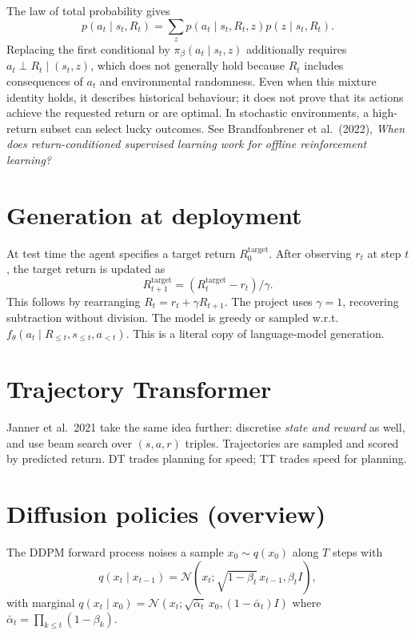 \documentclass[11pt,oneside]{scrbook}
\begin{document}
\begin{remark}
The law of total probability gives
\[
 p(a_t\mid s_t,R_t)=\sum_z p(a_t\mid s_t,R_t,z)p(z\mid s_t,R_t).
\]
Replacing the first conditional by $\pi_\beta(a_t\mid s_t,z)$ additionally
requires $a_t\perp R_t\mid(s_t,z)$, which does not generally hold because
$R_t$ includes consequences of $a_t$ and environmental randomness.
Even when this mixture identity holds, it describes historical behaviour;
it does not prove that its actions achieve the requested return or are
optimal. In stochastic environments, a high-return subset can select lucky
outcomes. See Brandfonbrener et al.\ (2022), \emph{When does return-conditioned
supervised learning work for offline reinforcement learning?}
\end{remark}

\section{Generation at deployment}

At test time the agent specifies a target return $R_0^{\mathrm{target}}$. After observing $r_t$ at step $t$, the target return is updated as
\[
  R_{t+1}^{\mathrm{target}} = (R_t^{\mathrm{target}} - r_t)/\gamma.
\]
This follows by rearranging $R_t=r_t+\gamma R_{t+1}$. The project uses $\gamma=1$, recovering subtraction without division. The model is greedy or sampled w.r.t.\ $f_\theta(a_t \mid R_{\le t}, s_{\le t}, a_{<t})$. This is a literal copy of language-model generation.

\section{Trajectory Transformer}

Janner et al.\ 2021 take the same idea further: discretise \emph{state and reward} as well, and use beam search over $(s, a, r)$ triples. Trajectories are sampled and scored by predicted return. DT trades planning for speed; TT trades speed for planning.

\section{Diffusion policies (overview)}

The DDPM forward process noises a sample $x_0 \sim q(x_0)$ along $T$ steps with
\[
  q(x_t \mid x_{t-1}) = \mathcal{N}(x_t; \sqrt{1 - \beta_t}\, x_{t-1}, \beta_t I),
\]
with marginal $q(x_t \mid x_0) = \mathcal{N}(x_t; \sqrt{\bar\alpha_t}\, x_0, (1 - \bar\alpha_t) I)$ where $\bar\alpha_t = \prod_{k \le t}(1-\beta_k)$.
\end{document}
